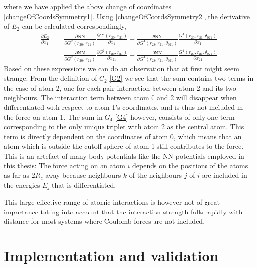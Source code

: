\documentclass[twoside,english]{uiofysmaster}
\begin{document}
where we have applied the above change of coordinates \eqref{changeOfCoordsSymmetry1}.
Using \eqref{changeOfCoordsSymmetry2}, the derivative of $E_2$ can be calculated correspondingly,
\begin{align}
 \frac{\partial E_2}{\partial x_1} &= 
 \frac{\partial \textrm{NN}}{\partial G^2(r_{20}, r_{21})}\frac{\partial G^2(r_{20}, r_{21})}{\partial x_1} + 
 \frac{\partial \textrm{NN}}{\partial G^4(r_{20},r_{21},\theta_{021})}\frac{G^4(r_{20},r_{21},\theta_{021})}{\partial x_1} \\
 &= \frac{\partial \textrm{NN}}{\partial G^2(r_{20}, r_{21})}\frac{\partial G^2(r_{20}, r_{21})}{\partial x_{21}} + 
 \frac{\partial \textrm{NN}}{\partial G^4(r_{20},r_{21},\theta_{021})}\frac{G^4(r_{20},r_{21},\theta_{021})}{\partial x_{21}}
\end{align}
Based on these expressions we can do an observation that at first might seem strange. 
From the definition of $G_2$ \eqref{G2} we see that the sum contains two terms
in the case of atom 2, one for each pair interaction between atom 2 and its two neighbours. 
The interaction term between atom 0 and 2 will 
disappear when differentiated with respect to atom 1's coordinates, and is thus not included in the force on atom 1. 
The sum in $G_4$ \eqref{G4} however, consists of only one term corresponding to the only unique triplet with atom 2
as the central atom. This term is directly dependent on the coordinates of atom 0, which means that 
an atom which is outside the cutoff sphere of atom 1 still contributes to the force. This is an artefact of many-body potentials
like the NN potentials employed in this thesis: The force acting on an atom $i$ depends on the positions of the atoms as 
far as $2R_c$ away because neighbours $k$ of the neighbours $j$ of $i$ are included in the 
energies $E_j$ that is differentiated. 

This large effective range of atomic interactions is however not of great importance taking into account
that the interaction strength falls rapidly with distance for most systems where Coulomb forces are not included. 












\part{Implementation and validation}
\end{document}
